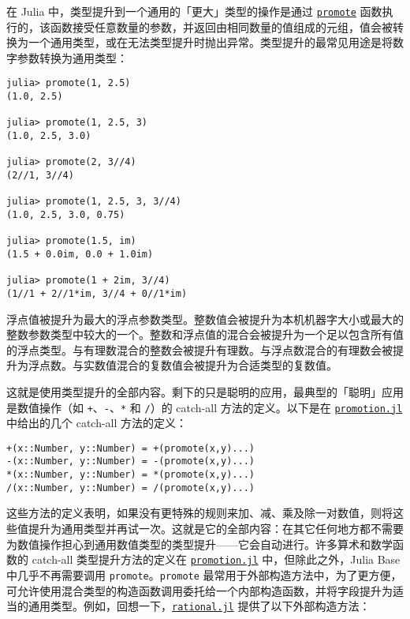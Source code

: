在 Julia 中，类型提升到一个通用的「更大」类型的操作是通过 \hyperlink{1760874576431605095}{\texttt{promote}} 函数执行的，该函数接受任意数量的参数，并返回由相同数量的值组成的元组，值会被转换为一个通用类型，或在无法类型提升时抛出异常。类型提升的最常见用途是将数字参数转换为通用类型：




\begin{verbatim}
julia> promote(1, 2.5)
(1.0, 2.5)

julia> promote(1, 2.5, 3)
(1.0, 2.5, 3.0)

julia> promote(2, 3//4)
(2//1, 3//4)

julia> promote(1, 2.5, 3, 3//4)
(1.0, 2.5, 3.0, 0.75)

julia> promote(1.5, im)
(1.5 + 0.0im, 0.0 + 1.0im)

julia> promote(1 + 2im, 3//4)
(1//1 + 2//1*im, 3//4 + 0//1*im)
\end{verbatim}



浮点值被提升为最大的浮点参数类型。整数值会被提升为本机机器字大小或最大的整数参数类型中较大的一个。整数和浮点值的混合会被提升为一个足以包含所有值的浮点类型。与有理数混合的整数会被提升有理数。与浮点数混合的有理数会被提升为浮点数。与实数值混合的复数值会被提升为合适类型的复数值。



这就是使用类型提升的全部内容。剩下的只是聪明的应用，最典型的「聪明」应用是数值操作（如 \texttt{+}、\texttt{-}、\texttt{*} 和 \texttt{/}）的 catch-all 方法的定义。以下是在 \href{https://github.com/JuliaLang/julia/blob/master/base/promotion.jl}{\texttt{promotion.jl}} 中给出的几个 catch-all 方法的定义：




\begin{verbatim}
+(x::Number, y::Number) = +(promote(x,y)...)
-(x::Number, y::Number) = -(promote(x,y)...)
*(x::Number, y::Number) = *(promote(x,y)...)
/(x::Number, y::Number) = /(promote(x,y)...)
\end{verbatim}



这些方法的定义表明，如果没有更特殊的规则来加、减、乘及除一对数值，则将这些值提升为通用类型并再试一次。这就是它的全部内容：在其它任何地方都不需要为数值操作担心到通用数值类型的类型提升——它会自动进行。许多算术和数学函数的 catch-all 类型提升方法的定义在 \href{https://github.com/JuliaLang/julia/blob/master/base/promotion.jl}{\texttt{promotion.jl}} 中，但除此之外，Julia Base 中几乎不再需要调用 \texttt{promote}。\texttt{promote} 最常用于外部构造方法中，为了更方便，可允许使用混合类型的构造函数调用委托给一个内部构造函数，并将字段提升为适当的通用类型。例如，回想一下，\href{https://github.com/JuliaLang/julia/blob/master/base/rational.jl}{\texttt{rational.jl}} 提供了以下外部构造方法：




